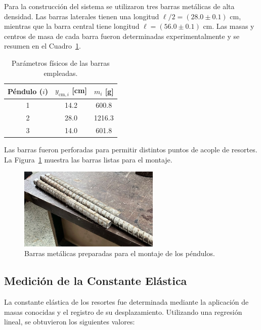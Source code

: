 Para la construcción del sistema se utilizaron tres barras metálicas de alta densidad. Las barras laterales tienen una longitud $\ell/2 = (28.0 \pm 0.1)$ cm, mientras que la barra central tiene longitud $\ell = (56.0 \pm 0.1)$ cm. Las masas y centros de masa de cada barra fueron determinadas experimentalmente y se resumen en el Cuadro~\ref{tab:parametros}.

\begin{table}[h!]
    \centering
    \caption{Parámetros físicos de las barras empleadas.}
    \label{tab:parametros}
    \begin{tabular}{c c c}
        \toprule
        Péndulo ($i$) & $y_{\text{cm},i}$ [cm] & $m_i$ [g] \\
        \midrule
        1 & 14.2 & 600.8 \\
        2 & 28.0 & 1216.3 \\
        3 & 14.0 & 601.8 \\
        \bottomrule
    \end{tabular}
\end{table}

Las barras fueron perforadas para permitir distintos puntos de acople de resortes. La Figura~\ref{fig:barras} muestra las barras listas para el montaje.

\begin{figure}[h!]
    \centering
    \includegraphics[width=0.6\textwidth]{Figures/metal-bars.jpeg}
    \caption{Barras metálicas preparadas para el montaje de los péndulos.}
    \label{fig:barras}
\end{figure}

\subsection{Medición de la Constante Elástica}

La constante elástica de los resortes fue determinada mediante la aplicación de masas conocidas y el registro de su desplazamiento. Utilizando una regresión lineal, se obtuvieron los siguientes valores:

